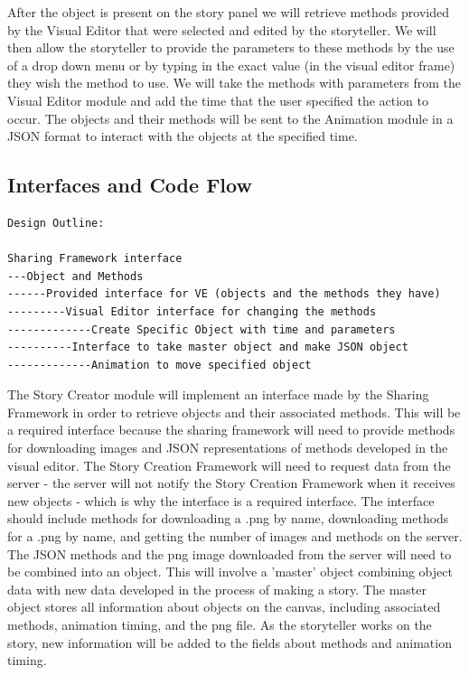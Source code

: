 \documentclass[12pt]{article}
\begin{document}
After the object is present on the story panel we will retrieve methods provided by the Visual Editor that were selected and edited by the storyteller.  We will then allow the storyteller to provide the parameters to these methods by the use of a drop down menu or by typing in the exact value (in the visual editor frame) they wish the method to use.  We will take the methods with parameters from the Visual Editor module and add the time that the user specified the action to occur.  The objects and their methods will be sent to the Animation module in a JSON format to interact with the objects at the specified time.  \\

\subsection{Interfaces and Code Flow}

\begin{verbatim}
Design Outline:

Sharing Framework interface
---Object and Methods 
------Provided interface for VE (objects and the methods they have)
---------Visual Editor interface for changing the methods 
-------------Create Specific Object with time and parameters 
----------Interface to take master object and make JSON object 
-------------Animation to move specified object 
\end{verbatim}


The Story Creator module will implement an interface made by the Sharing Framework in order to retrieve objects and their associated methods.  This will be a required interface because the sharing framework will need to provide methods for downloading images and JSON representations of methods developed in the visual editor. The Story Creation Framework will need to request data from the server - the server will not notify the Story Creation Framework when it receives new objects - which is why the interface is a required interface. The interface should include methods for downloading a .png by name, downloading methods for a .png by name, and getting the number of images and methods on the server. \\

The JSON methods and the png image downloaded from the server will need to be combined into an object. This will involve a 'master' object combining object data with new data developed in the process of making a story. The master object stores all information about objects on the canvas, including associated methods, animation timing, and the png file. As the storyteller works on the story, new information will be added to the fields about methods and animation timing. \\
\end{document}
